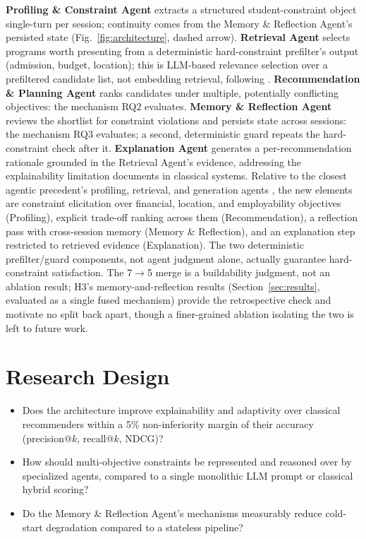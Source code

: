 \documentclass[conference]{IEEEtran}
\begin{document}
\textbf{Profiling \& Constraint Agent} extracts a structured student-constraint object
single-turn per session; continuity comes from the Memory \& Reflection Agent's persisted
state (Fig.~\ref{fig:architecture}, dashed arrow). \textbf{Retrieval Agent} selects
programs worth presenting from a deterministic hard-constraint prefilter's output
(admission, budget, location); this is LLM-based relevance selection over a prefiltered
candidate list, not embedding retrieval, following \cite{ragpersonalisedrecommendations}.
\textbf{Recommendation \& Planning Agent} ranks candidates under multiple, potentially
conflicting objectives: the mechanism RQ2 evaluates. \textbf{Memory \& Reflection Agent}
reviews the shortlist for constraint violations and persists state across sessions: the
mechanism RQ3 evaluates; a second, deterministic guard repeats the hard-constraint check
after it. \textbf{Explanation Agent} generates a per-recommendation rationale grounded in
the Retrieval Agent's evidence, addressing the explainability limitation
\cite{recommendersyshighered} documents in classical systems. Relative to the closest
agentic precedent's profiling, retrieval, and generation agents \cite{onlinecoursemaskg},
the new elements are constraint elicitation over financial, location, and employability
objectives (Profiling), explicit trade-off ranking across them (Recommendation), a
reflection pass with cross-session memory (Memory \& Reflection), and an explanation
step restricted to retrieved evidence (Explanation). The two deterministic
prefilter/guard components, not agent judgment alone, actually guarantee hard-constraint
satisfaction. The 7$\to$5 merge is a buildability judgment, not an ablation result; H3's
memory-and-reflection results (Section~\ref{sec:results}, evaluated as a single fused
mechanism) provide the retrospective check and motivate no split back apart, though a
finer-grained ablation isolating the two is left to future work.

\section{Research Design}
\label{sec:methodology}

\begin{itemize}[leftmargin=2.6em, labelwidth=2.3em, labelsep=0.3em, align=left, itemsep=1pt, topsep=2pt]
\item[\textbf{RQ1.}] Does the architecture improve explainability and adaptivity over
classical recommenders \cite{hrspca,studieme,multidmensionalrecsysuni} within a 5\%
non-inferiority margin of their accuracy (precision@$k$, recall@$k$, NDCG)?
\item[\textbf{RQ2.}] How should multi-objective constraints be represented and reasoned
over by specialized agents, compared to a single monolithic LLM prompt or classical
hybrid scoring?
\item[\textbf{RQ3.}] Do the Memory \& Reflection Agent's mechanisms measurably reduce
cold-start degradation compared to a stateless pipeline?
\end{itemize}
\end{document}
